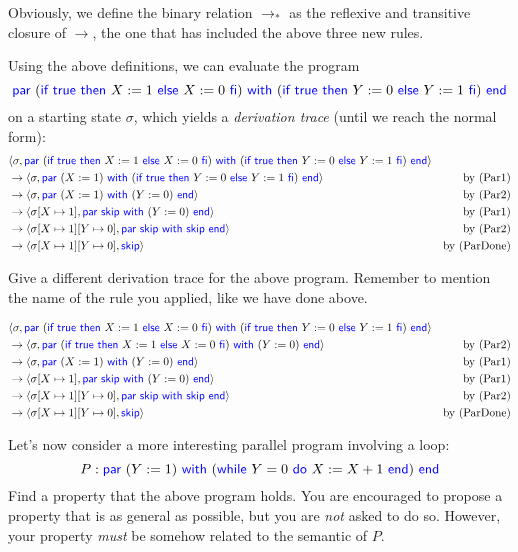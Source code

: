\documentclass[11pt,a4paper]{article}
\newcommand{\toM}{\to_{*}}
\newcommand{\pair}[1]{\langle #1 \rangle}
\newcommand{\kword}[1]{{\color{blue} \textsf{#1}}}
\newcommand{\True}{\kword{true}}
\newcommand{\Skip}{\kword{skip}}
\newcommand{\If}{\kword{if}}
\newcommand{\Then}{\kword{then}}
\newcommand{\Else}{\kword{else}}
\newcommand{\Fi}{\kword{fi}}
\newcommand{\While}{\kword{while}}
\newcommand{\Do}{\kword{do}}
\newcommand{\End}{\kword{end}}
\newcommand{\Par}{\kword{par}}
\newcommand{\With}{\kword{with}}
\begin{document}
Obviously, we define the binary relation $\toM$ as the reflexive and transitive closure of $\to$,
the one that has included the above three new rules.

Using the above definitions, we can evaluate the program
$$\Par~(\If~\True~\Then~X:=1~\Else~X:=0~\Fi)~\With~(\If~\True~\Then~Y:=0~\Else~Y:=1~\Fi)~\End$$
on a starting state $\sigma$, which yields a \emph{derivation trace} (until we reach the normal form):
\begin{align*}
	&    \pair{\sigma,\Par~(\If~\True~\Then~X:=1~\Else~X:=0~\Fi)~\With~(\If~\True~\Then~Y:=0~\Else~Y:=1~\Fi)~\End} & \\
	&\to \pair{\sigma,\Par~(X:=1)~\With~(\If~\True~\Then~Y:=0~\Else~Y:=1~\Fi)~\End} & \text{by (Par1)} \\
	&\to \pair{\sigma,\Par~(X:=1)~\With~(Y:=0)~\End} & \text{by (Par2)} \\
	&\to \pair{\sigma[X \mapsto 1],\Par~\Skip~\With~(Y:=0)~\End} & \text{by (Par1)} \\
	&\to \pair{\sigma[X \mapsto 1][Y \mapsto 0],\Par~\Skip~\With~\Skip~\End} & \text{by (Par2)} \\
	&\to \pair{\sigma[X \mapsto 1][Y \mapsto 0],\Skip} & \text{by (ParDone)}
\end{align*}

\subproblem Give a different derivation trace for the above program.
Remember to mention the name of the rule you applied, like we have done above.

\begin{solution}
\begin{align*}
	&    \pair{\sigma,\Par~(\If~\True~\Then~X:=1~\Else~X:=0~\Fi)~\With~(\If~\True~\Then~Y:=0~\Else~Y:=1~\Fi)~\End} & \\
	&\to \pair{\sigma,\Par~(\If~\True~\Then~X:=1~\Else~X:=0~\Fi)~\With~(Y:=0)~\End} & \text{by (Par2)} \\
  &\to \pair{\sigma,\Par~(X:=1)~\With~(Y:=0)~\End} & \text{by (Par1)} \\
	&\to \pair{\sigma[X \mapsto 1],\Par~\Skip~\With~(Y:=0)~\End} & \text{by (Par1)} \\
	&\to \pair{\sigma[X \mapsto 1][Y \mapsto 0],\Par~\Skip~\With~\Skip~\End} & \text{by (Par2)} \\
	&\to \pair{\sigma[X \mapsto 1][Y \mapsto 0],\Skip} & \text{by (ParDone)}
\end{align*}
\end{solution}

\subproblem Let's now consider a more interesting parallel program involving a loop:
$$P: \Par~(Y:=1)~\With~(\While~Y=0~\Do~X:=X+1~\End)~\End$$
Find a property that the above program holds.
You are encouraged to propose a property that is as general as possible, but you are \emph{not} asked to do so.
However, your property \emph{must} be somehow related to the semantic of $P$.
\end{document}
